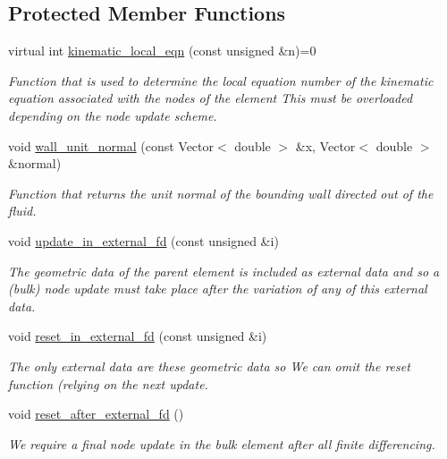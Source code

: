 \subsection*{Protected Member Functions}
\begin{DoxyCompactItemize}
\item 
virtual int \hyperlink{classoomph_1_1FluidInterfaceBoundingElement_a12a0a6d7c3c1c1a5a0f42a57e60eab34}{kinematic\+\_\+local\+\_\+eqn} (const unsigned \&n)=0
\begin{DoxyCompactList}\small\item\em Function that is used to determine the local equation number of the kinematic equation associated with the nodes of the element This must be overloaded depending on the node update scheme. \end{DoxyCompactList}\item 
void \hyperlink{classoomph_1_1FluidInterfaceBoundingElement_a1a715427e2037278891c06afd5d096fb}{wall\+\_\+unit\+\_\+normal} (const Vector$<$ double $>$ \&x, Vector$<$ double $>$ \&normal)
\begin{DoxyCompactList}\small\item\em Function that returns the unit normal of the bounding wall directed out of the fluid. \end{DoxyCompactList}\item 
void \hyperlink{classoomph_1_1FluidInterfaceBoundingElement_ab2639a1585fe815bed2d2a3d69fa5164}{update\+\_\+in\+\_\+external\+\_\+fd} (const unsigned \&i)
\begin{DoxyCompactList}\small\item\em The geometric data of the parent element is included as external data and so a (bulk) node update must take place after the variation of any of this external data. \end{DoxyCompactList}\item 
void \hyperlink{classoomph_1_1FluidInterfaceBoundingElement_a7347eb5984a18ffb1cfea1f9240badee}{reset\+\_\+in\+\_\+external\+\_\+fd} (const unsigned \&i)
\begin{DoxyCompactList}\small\item\em The only external data are these geometric data so We can omit the reset function (relying on the next update. \end{DoxyCompactList}\item 
void \hyperlink{classoomph_1_1FluidInterfaceBoundingElement_a6b0de0d11dfcfc912e2f56fbd6359ebe}{reset\+\_\+after\+\_\+external\+\_\+fd} ()
\begin{DoxyCompactList}\small\item\em We require a final node update in the bulk element after all finite differencing. \end{DoxyCompactList}\end{DoxyCompactItemize}
